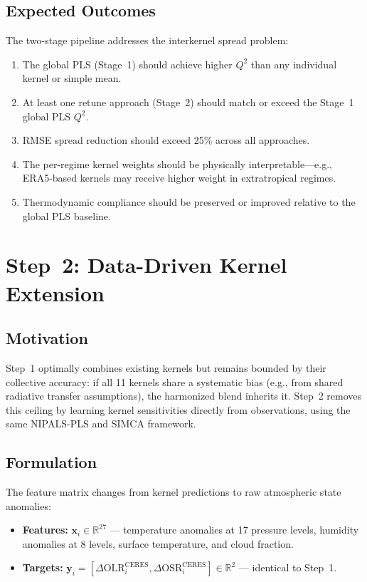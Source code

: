 \documentclass[11pt]{article}
\newcommand{\Qsq}{Q^{2}}
\begin{document}
\subsection{Expected Outcomes}

The two-stage pipeline addresses the interkernel spread problem:
\begin{enumerate}[noitemsep]
  \item The global PLS (Stage~1) should achieve higher $\Qsq$
    than any individual kernel or simple mean.
  \item At least one retune approach (Stage~2) should match
    or exceed the Stage~1 global PLS $\Qsq$.
  \item RMSE spread reduction should exceed 25\% across
    all approaches.
  \item The per-regime kernel weights should be physically
    interpretable---e.g., ERA5-based kernels may receive higher
    weight in extratropical regimes.
  \item Thermodynamic compliance should be preserved or
    improved relative to the global PLS baseline.
\end{enumerate}

\section{Step~2: Data-Driven Kernel Extension}
\label{sec:datadriven}

\subsection{Motivation}

Step~1 optimally combines existing kernels but remains bounded
by their collective accuracy: if all 11 kernels share a
systematic bias (e.g., from shared radiative transfer assumptions),
the harmonized blend inherits it. Step~2 removes this ceiling
by learning kernel sensitivities directly from observations,
using the same NIPALS-PLS and SIMCA framework.

\subsection{Formulation}

The feature matrix changes from kernel predictions to raw
atmospheric state anomalies:

\begin{itemize}[noitemsep]
  \item \textbf{Features:} $\mathbf{x}_i \in \mathbb{R}^{27}$
    --- temperature anomalies at 17 pressure levels, humidity
    anomalies at 8 levels, surface temperature, and cloud fraction.
  \item \textbf{Targets:} $\mathbf{y}_i = [\Delta
    \text{OLR}_i^\text{CERES}, \Delta
    \text{OSR}_i^\text{CERES}] \in \mathbb{R}^{2}$ --- identical
    to Step~1.
\end{itemize}
\end{document}
